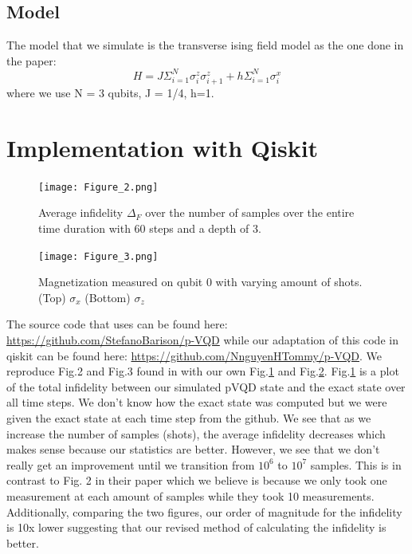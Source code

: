 \documentclass{article}
\begin{document}
\subsection{Model}
The model that we simulate is the transverse ising field model as the one done in the paper:
\begin{equation}
    H = J\Sigma_{i=1}^{N} \sigma^z_i \sigma^z_{i+1} + h\Sigma_{i=1}^{N} \sigma^x_i
\end{equation}
where we use N = 3 qubits, J = 1/4, h=1.
\section{Implementation with Qiskit \cite{Barison_2021}}
\begin{figure}[!htb]
    \centering
        \texttt{[image: Figure\_2.png]}
        \caption{Average infidelity $\Delta_F$ over the number of samples over the entire time duration with 60 steps and a depth of 3. }
        \label{fig1}
\end{figure}
\begin{figure}[!htb]
        \centering
        \texttt{[image: Figure\_3.png]}
        \caption{Magnetization measured on qubit 0 with varying amount of shots. (Top) $\sigma_x$ (Bottom) $\sigma_z$ }
        \label{fig2}
\end{figure}
 The source code that \cite{Barison_2021} uses can be found here: \hyperlink{https://github.com/StefanoBarison/p-VQD}{https://github.com/StefanoBarison/p-VQD} while our adaptation of this code in qiskit can be found here: \hyperlink{https://github.com/NnguyenHTommy/p-VQD}{https://github.com/NnguyenHTommy/p-VQD}. We reproduce Fig.2 and Fig.3 found in \cite{Barison_2021} with our own Fig.\ref{fig1} and Fig.\ref{fig2}. Fig.\ref{fig1} is a plot of the total infidelity between our simulated pVQD state and the exact state over all time steps. We don't know how the exact state was computed but we were given the exact state at each time step from the github. We see that as we increase the number of samples (shots), the average infidelity decreases which makes sense because our statistics are better. However, we see that we don't really get an improvement until we transition from $10^6$ to $10^7$ samples. This is in contrast to Fig. 2 in their paper which we believe is because we only took one measurement at each amount of samples while they took 10 measurements. Additionally, comparing the two figures, our order of magnitude for the infidelity is 10x lower suggesting that our revised method of calculating the infidelity is better.
\end{document}
